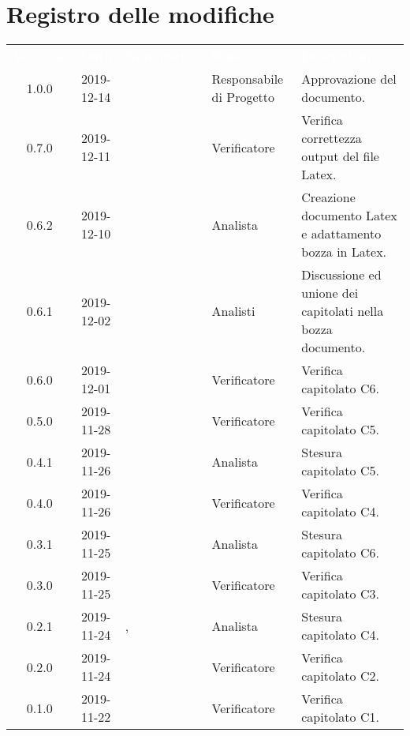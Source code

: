 \section*{Registro delle modifiche}
{
\renewcommand{\arraystretch}{1.5}
\centering
\begin{longtable}{ c c  C{4cm}  C{3cm} C{4cm}}
\textcolor{white}{\textbf{Versione}} & \textcolor{white}{\textbf{Data}} & \textcolor{white}{\textbf{Nominativo}} & \textcolor{white}{\textbf{Ruolo}} & \textcolor{white}{\textbf{Descrizione}}\\	

1.0.0 & 2019-12-14 & \SE{} & Responsabile di Progetto & Approvazione del documento. \\	

0.7.0 & 2019-12-11 & \DF{} & Verificatore & Verifica correttezza output del file Latex. \\

0.6.2 & 2019-12-10 & \MC{} & Analista & Creazione documento Latex e adattamento bozza in Latex. \\

0.6.1 & 2019-12-02 & \Gruppo{} & Analisti & Discussione ed unione dei capitolati nella bozza documento. \\

0.6.0 & 2019-12-01 & \DF{} & Verificatore & Verifica capitolato C6. \\

0.5.0 & 2019-11-28 & \DF{} & Verificatore & Verifica capitolato C5. \\

0.4.1 & 2019-11-26 & \BR{} & Analista & Stesura capitolato C5. \\

0.4.0 & 2019-11-26 & \DF{} & Verificatore & Verifica capitolato C4. \\

0.3.1 & 2019-11-25 & \MC{} & Analista & Stesura capitolato C6. \\

0.3.0 & 2019-11-25 & \DF{} & Verificatore & Verifica capitolato C3. \\

0.2.1 & 2019-11-24 & \LD{}, \CE{} & Analista & Stesura capitolato C4. \\

0.2.0 & 2019-11-24 & \DF{} & Verificatore & Verifica capitolato C2. \\

0.1.0 & 2019-11-22 & \DF{} & Verificatore & Verifica capitolato C1. \\


\end{longtable}}
